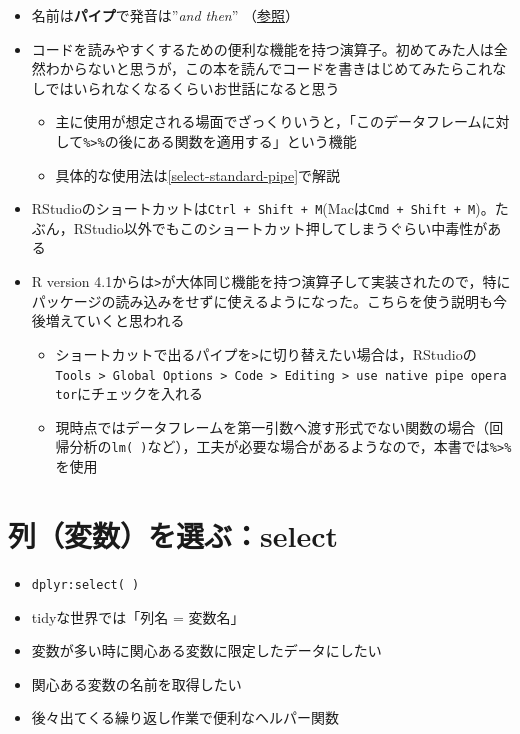 \documentclass[
  xelatex,ja=standard, b5paper]{bxjsbook}
\providecommand{\tightlist}{%
  \setlength{\itemsep}{0pt}\setlength{\parskip}{0pt}}
\begin{document}
\begin{itemize}
\tightlist
\item
  名前は\textbf{パイプ}で発音は''\emph{and then}'' （\href{https://adv-r.hadley.nz/functions.html\#function-composition}{参照}）
\item
  コードを読みやすくするための便利な機能を持つ演算子。初めてみた人は全然わからないと思うが，この本を読んでコードを書きはじめてみたらこれなしではいられなくなるくらいお世話になると思う

  \begin{itemize}
  \tightlist
  \item
    主に使用が想定される場面でざっくりいうと，「このデータフレームに対して\texttt{\%\textgreater{}\%}の後にある関数を適用する」という機能
  \item
    具体的な使用法は\ref{select-standard-pipe}で解説
  \end{itemize}
\item
  RStudioのショートカットは\texttt{Ctrl\ +\ Shift\ +\ M}(Macは\texttt{Cmd\ +\ Shift\ +\ M})。たぶん，RStudio以外でもこのショートカット押してしまうぐらい中毒性がある
\item
  R version 4.1からは\texttt{\textbar{}\textgreater{}}が大体同じ機能を持つ演算子して実装されたので，特にパッケージの読み込みをせずに使えるようになった。こちらを使う説明も今後増えていくと思われる

  \begin{itemize}
  \tightlist
  \item
    ショートカットで出るパイプを\texttt{\textbar{}\textgreater{}}に切り替えたい場合は，RStudioの\texttt{Tools\ \textgreater{}\ Global\ Options\ \textgreater{}\ Code\ \textgreater{}\ Editing\ \textgreater{}\ use\ native\ pipe\ operator}にチェックを入れる
  \item
    現時点ではデータフレームを第一引数へ渡す形式でない関数の場合（回帰分析の\texttt{lm(\ )}など），工夫が必要な場合があるようなので，本書では\texttt{\%\textgreater{}\%}を使用
  \end{itemize}
\end{itemize}

\hypertarget{select}{%
\chapter{列（変数）を選ぶ：select}\label{select}}

\begin{itemize}
\tightlist
\item
  \texttt{dplyr:select(\ )}
\item
  tidyな世界では「列名 = 変数名」
\item
  変数が多い時に関心ある変数に限定したデータにしたい
\item
  関心ある変数の名前を取得したい
\item
  後々出てくる繰り返し作業で便利なヘルパー関数
\end{itemize}
\end{document}
